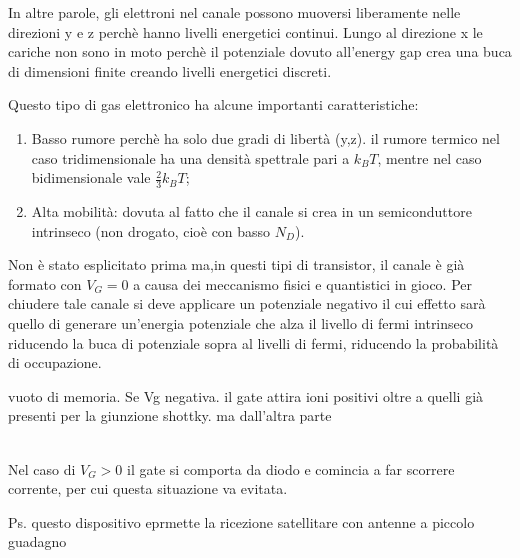 \begin{exbox}
    In altre parole, gli elettroni nel canale possono muoversi liberamente nelle direzioni y e z perchè hanno livelli energetici continui. Lungo al direzione x le cariche non sono in moto perchè il potenziale dovuto all'energy gap crea una buca di dimensioni finite creando livelli energetici discreti.
\end{exbox}

Questo tipo di gas elettronico ha alcune importanti caratteristiche:
\begin{enumerate}
    \item Basso rumore perchè ha solo due gradi di libertà (y,z). il rumore termico nel caso tridimensionale ha una densità spettrale pari a $k_BT$, mentre nel caso bidimensionale vale $\frac{2}{3}k_BT$;
    \item Alta mobilità: dovuta al fatto che il canale si crea in un semiconduttore intrinseco (non drogato, cioè con basso $N_D$).
\end{enumerate}
%
\begin{minipage}{0.55\textwidth}
    Non è stato esplicitato prima ma,in questi tipi di transistor, il canale è già formato con $V_G=0$ a causa dei meccanismo fisici e quantistici in gioco. Per chiudere tale canale si deve applicare un potenziale negativo il cui effetto sarà quello di generare un'energia potenziale che alza il livello di fermi intrinseco riducendo la buca di potenziale sopra al livelli di fermi, riducendo la probabilità di occupazione.
    \begin{ricevimento}
        vuoto di memoria. Se Vg negativa. il gate attira ioni positivi oltre a quelli già presenti per la giunzione shottky. ma dall'altra parte
    \end{ricevimento}
\end{minipage}
\hfill
\begin{minipage}{0.4\textwidth}
    \begin{center}
\end{center}
\end{minipage}
\\%
Nel caso di $V_G>0$ il gate si comporta da diodo e comincia a far scorrere corrente, per cui questa situazione va evitata.\\
%
\begin{psbox}
    Ps. questo dispositivo eprmette la ricezione satellitare con antenne a piccolo guadagno
\end{psbox}
%
\cleardoublepage
